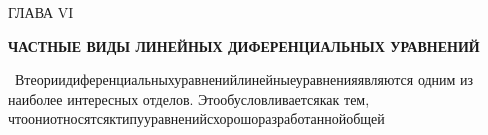 \documentclass[10pt, a5paper, twoside]{book}
\begin{document}
\setlength{\abovedisplayskip}{3pt}
\setlength{\abovedisplayshortskip}{3pt}
\setlength{\belowdisplayskip}{3pt}
\setlength{\belowdisplayshortskip}{3pt}
\hfill \break
\hfill \break
\hfill \break
\begin{center}
ГЛАВА VI
\end{center}
\begin{center}
\textbf{\scriptsize{ЧАСТНЫЕ ВИДЫ ЛИНЕЙНЫХ ДИФЕРЕНЦИАЛЬНЫХ УРАВНЕНИЙ}}
\end{center}

\indent\, В\hspace{0.8mm}теории\hspace{0.8mm}диференциальных\hspace{0.8mm}уравнений\hspace{0.8mm}линейные\hspace{0.8mm}уравнения\hspace{0.8mm}являются одним из наиболее интересных отделов. Это\hspace{1.5mm}обусловливается\hspace{1.6mm}как тем, что\hspace{1.8mm}они\hspace{1.9mm}относятся\hspace{1.9mm}к\hspace{1.8mm}типу\hspace{1.9mm}уравнений\hspace{2mm}с\hspace{1.9mm}хорошо\hspace{2mm}разработанной\hspace{2mm}общей\hspace{1.9mm}\linebreak
\end{document}

